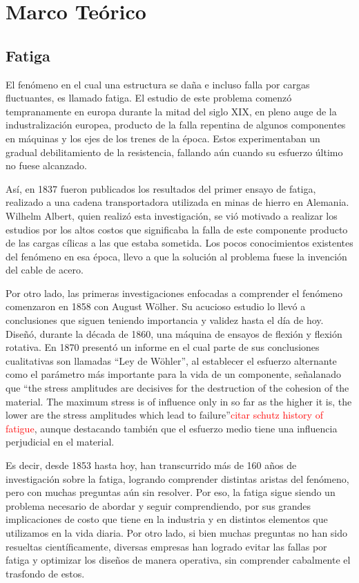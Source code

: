 \chapter{Marco Teórico}
\section{Fatiga}

El fenómeno en el cual una estructura se daña e incluso falla por cargas fluctuantes, es llamado fatiga. El estudio de este problema comenzó tempranamente en europa durante la mitad del siglo XIX, en pleno auge de la industralización europea, producto de la falla repentina de algunos componentes en máquinas y los ejes de los trenes de la época. Estos experimentaban un gradual debilitamiento de la resistencia, fallando aún cuando su esfuerzo último no fuese alcanzado. 

Así, en 1837 fueron publicados los resultados del primer ensayo de fatiga, realizado a una cadena transportadora utilizada en minas de hierro en Alemania. Wilhelm Albert, quien realizó esta investigación, se vió motivado a realizar los estudios por los altos costos que significaba la falla de este componente producto de las cargas cílicas a las que estaba sometida. Los pocos conocimientos existentes del fenómeno en esa época, llevo a que la solución al problema fuese la invención del cable de acero.

Por otro lado, las primeras investigaciones enfocadas a comprender el fenómeno comenzaron en 1858 con August Wölher. Su acucioso estudio lo llevó a conclusiones que siguen teniendo importancia y validez hasta el día de hoy. Diseñó, durante la década de 1860, una máquina de ensayos de flexión y flexión rotativa. En 1870 presentó un informe en el cual parte de sus conclusiones cualitativas son llamadas ``Ley de Wöhler'', al establecer el esfuerzo alternante como el parámetro más importante para la vida de un componente, señalanado que ``the stress amplitudes are decisives for the destruction of the cohesion of the material. The maximum stress is of influence only in so far as the higher it is, the lower are the stress amplitudes which lead to failure''\textcolor{red}{citar schutz history of fatigue}, aunque destacando también que el esfuerzo medio tiene una influencia perjudicial en el material. 

Es decir, desde 1853 hasta hoy, han transcurrido más de 160 años de investigación sobre la fatiga, logrando comprender distintas aristas del fenómeno, pero con muchas preguntas aún sin resolver. Por eso, la fatiga sigue siendo un problema necesario de abordar y seguir comprendiendo, por sus grandes implicaciones de costo que tiene en la industria y en distintos elementos que utilizamos en la vida diaria. Por otro lado, si bien muchas preguntas no han sido resueltas científicamente, diversas empresas han logrado evitar las fallas por fatiga y optimizar los diseños de manera operativa, sin comprender cabalmente el trasfondo de estos.  



